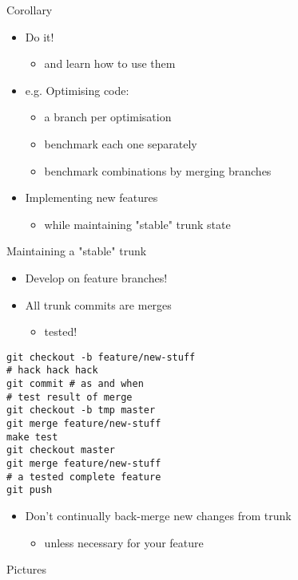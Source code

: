 \documentclass[presentation]{beamer}
\begin{document}
\begin{frame}[label=sec-1-4]{Corollary}
\begin{itemize}
\item Do it!
\begin{itemize}
\item and learn how to use them
\end{itemize}
\item e.g. Optimising code:
\begin{itemize}
\item a branch per optimisation
\item benchmark each one separately
\item benchmark combinations by merging branches
\end{itemize}

\item Implementing new features
\begin{itemize}
\item while maintaining "stable" trunk state
\end{itemize}
\end{itemize}
\end{frame}
\begin{frame}[fragile,label=sec-1-5]{Maintaining a "stable" trunk}
 \begin{itemize}
\item Develop on feature branches!
\item All trunk commits are merges
\begin{itemize}
\item tested!
\end{itemize}
\end{itemize}

\begin{verbatim}
git checkout -b feature/new-stuff
# hack hack hack
git commit # as and when
# test result of merge
git checkout -b tmp master
git merge feature/new-stuff
make test
git checkout master
git merge feature/new-stuff
# a tested complete feature
git push
\end{verbatim}
\begin{itemize}
\item Don't continually back-merge new changes from trunk
\begin{itemize}
\item unless necessary for your feature
\end{itemize}
\end{itemize}
\end{frame}
\begin{frame}[label=sec-1-6]{Pictures}
\begin{center}
\end{center}
\end{frame}
\end{document}
